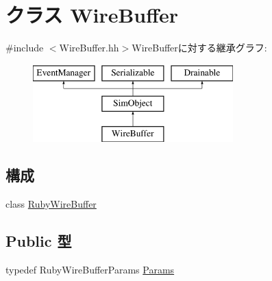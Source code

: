\hypertarget{classWireBuffer}{
\section{クラス WireBuffer}
\label{classWireBuffer}
}


{\ttfamily \#include $<$WireBuffer.hh$>$}WireBufferに対する継承グラフ:\begin{figure}[H]
\begin{center}
\leavevmode
\includegraphics[height=3cm]{classWireBuffer}
\end{center}
\end{figure}
\subsection*{構成}
\begin{DoxyCompactItemize}
\item 
class \hyperlink{classWireBuffer_1_1RubyWireBuffer}{RubyWireBuffer}
\end{DoxyCompactItemize}
\subsection*{Public 型}
\begin{DoxyCompactItemize}
\item 
typedef RubyWireBufferParams \hyperlink{classWireBuffer_a7ad77180949dea9bc226a0f7571391a0}{Params}
\end{DoxyCompactItemize}
